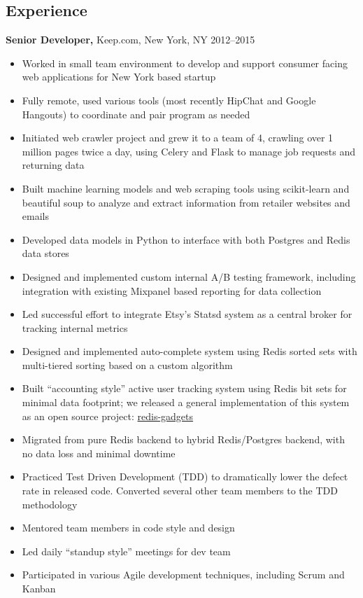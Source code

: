 \documentclass[margin]{res}
\begin{document}
\begin{resume}
\section{Experience}
 {\bf Senior Developer,} Keep.com, New York, NY \hfill 2012--2015
\begin{itemize}
  \item Worked in small team environment to develop and support consumer
    facing web applications for New York based startup
  \item Fully remote, used various tools (most recently HipChat and Google
    Hangouts) to coordinate and pair program as needed
  \item Initiated web crawler project and grew it to a team of 4, crawling
    over 1 million pages twice a day, using Celery and Flask to manage job
    requests and returning data
  \item Built machine learning models and web scraping tools using
    scikit-learn and beautiful soup to analyze and extract information from
    retailer websites and emails
  \item Developed data models in Python to interface with both Postgres and
    Redis data stores
  \item Designed and implemented custom internal A/B testing framework,
    including integration with existing Mixpanel based reporting for data
    collection
  \item Led successful effort to integrate Etsy's Statsd system as a central
    broker for tracking internal metrics
  \item Designed and implemented auto-complete system using Redis sorted sets
    with multi-tiered sorting based on a custom algorithm
  \item Built ``accounting style'' active user tracking system using Redis bit
    sets for minimal data footprint; we released a general implementation of
    this system as an open source project:
    \href{https://github.com/saltmine/redis-gadgets}{redis-gadgets}
  \item Migrated from pure Redis backend to hybrid Redis/Postgres backend,
      with no data loss and minimal downtime
  \item Practiced Test Driven Development (TDD) to dramatically lower the
      defect rate in released code.  Converted several other team members to
      the TDD methodology
  \item Mentored team members in code style and design
  \item Led daily ``standup style'' meetings for dev team
  \item Participated in various Agile development techniques, including Scrum
    and Kanban
\end{itemize}


\end{resume}
\end{document}
